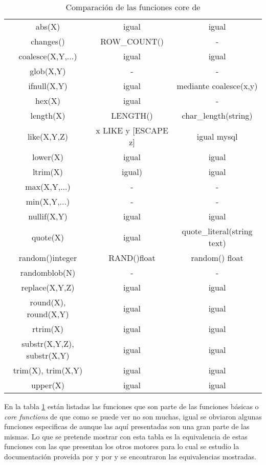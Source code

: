 \begin{table}[h]
\begin{center}
{
\selectfont
\begin{tabular}{|c|c|c|}
\hline 
\s & \m & \p \\  
\hline 
abs(X) & igual & igual \\ 
\hline 
changes() & ROW\_COUNT() & - \\ 
\hline 
coalesce(X,Y,...) & igual & igual \\ 
\hline 
glob(X,Y) & - & - \\ 
\hline 
ifnull(X,Y) & igual & mediante coalesce(x,y) \\ 
\hline 
hex(X) & igual & - \\ 
\hline 
length(X) & LENGTH() & char\_length(string) \\ 
\hline 
like(X,Y,Z) & x LIKE y [ESCAPE z] & igual mysql \\ 
\hline 
lower(X) & igual & igual \\ 
\hline 
ltrim(X) & igual) & igual \\ 
\hline 
max(X,Y,...) & - & - \\ 
\hline 
min(X,Y,...) & - & - \\ 
\hline 
nullif(X,Y) & igual & igual \\ 
\hline 
quote(X) & igual & quote\_literal(string text) \\ 
\hline 
random()integer & RAND()float & random() float \\ 
\hline 
randomblob(N) & - & - \\ 
\hline 
replace(X,Y,Z) & igual & igual \\ 
\hline 
round(X), round(X,Y) & igual & igual \\ 
\hline 
rtrim(X) & igual & igual \\ 
\hline 
substr(X,Y,Z), substr(X,Y) & igual & igual \\ 
\hline
trim(X), trim(X,Y) & igual & igual \\ 
\hline
upper(X) & igual & igual \\ 
\hline
\end{tabular}
}
\end{center}
\caption{Comparación de las funciones core de \s}
\label{tabla:core_functions}
\end{table}  
%
En la tabla \ref{tabla:core_functions} están listadas las funciones que son parte de las funciones básicas\citep{sqlite:functions} o \textit{core functions} de \s que como se puede ver no son muchas, igual se obviaron algunas funciones especificas de \s aunque las aquí presentadas son una gran parte de las mismas. Lo que se pretende mostrar con esta tabla es la equivalencia de estas funciones con las que presentan los otros motores para lo cual se estudio la documentación proveída por \p\cite{postgre:functions} y por \m\citep{mysql:functions} y se encontraron las equivalencias mostradas.

